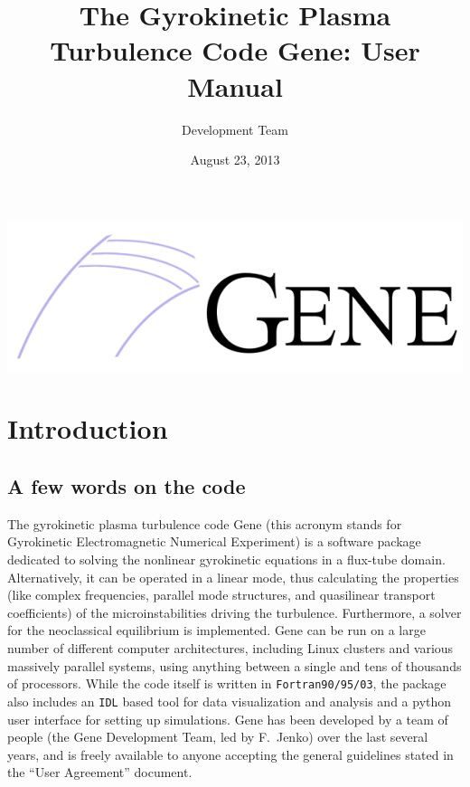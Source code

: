 \documentclass[12pt]{article}
\begin{document}
\title{The Gyrokinetic Plasma Turbulence Code {\sc Gene}: User Manual}
\vspace{1cm}
\date{\Large August 23, 2013}
\author{\gene Development Team}

\maketitle

\vspace{2cm}
\begin{center}
\includegraphics[width=\textwidth]{gene_logo2.png}
\end{center}

\thispagestyle{empty}
\newpage

\tableofcontents

\newpage
\section{Introduction}
\label{sec:intro}

\subsection{A few words on the code}
The gyrokinetic plasma turbulence code {\sc Gene} (this acronym stands for Gyrokinetic Electromagnetic
Numerical Experiment) is a software package dedicated to solving the nonlinear gyrokinetic
equations in a flux-tube domain. Alternatively, it can be operated in a linear mode, thus
calculating the properties (like complex frequencies, parallel mode structures, and quasilinear
transport coefficients) of the microinstabilities driving the turbulence. Furthermore, a solver for the neoclassical
equilibrium is implemented. {\sc Gene} can be run on
a large number of different computer architectures, including Linux clusters and various massively
parallel systems, using anything between a single and tens of thousands of processors. While the code
itself is written in {\tt Fortran90/95/03}, the package also includes an {\tt IDL} based tool for data
visualization and analysis and a python user interface for setting up simulations. {\sc Gene} has been developed 
by a team of people (the Gene Development Team, led by F.~Jenko) over the last several years, and is 
freely available to anyone accepting the general guidelines stated in the ``User Agreement'' document.
\end{document}
